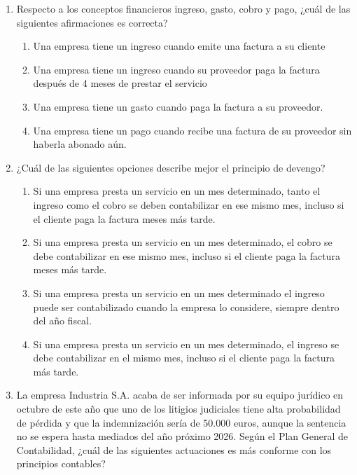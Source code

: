 \begin{enumerate}
\begin{enumerate}
        \item Si el EBITDA es negativo, quiere decir que la empresa no es rentable, puesto que el resultado bruto de explotación es negativo e incluso sin hacer frente a intereses e impuestos.
        \item Todas las anteriores
    \end{enumerate}
    \item Respecto a los conceptos financieros ingreso, gasto, cobro y pago, ¿cuál de las siguientes afirmaciones es correcta?
    \begin{enumerate}
        \item Una empresa tiene un ingreso cuando emite una factura a su cliente
        \item Una empresa tiene un ingreso cuando su proveedor paga la factura después de 4 meses de prestar el servicio
        \item Una empresa tiene un gasto cuando paga la factura a su proveedor.
        \item Una empresa tiene un pago cuando recibe una factura de su proveedor sin haberla abonado aún.
    \end{enumerate}
    \item ¿Cuál de las siguientes opciones describe mejor el principio de devengo?
    \begin{enumerate}
        \item Si una empresa presta un servicio en un mes determinado, tanto el ingreso como el cobro se deben contabilizar en ese mismo mes, incluso si el cliente paga la factura meses más tarde.
        \item Si una empresa presta un servicio en un mes determinado, el cobro se debe contabilizar en ese mismo mes, incluso si el cliente paga la factura meses más tarde.
        \item Si una empresa presta un servicio en un mes determinado el ingreso puede ser contabilizado cuando la empresa lo  considere, siempre dentro del año fiscal.
        \item Si una empresa presta un servicio en un mes determinado, el ingreso se debe contabilizar en el mismo mes, incluso si el cliente paga la factura más tarde.
    \end{enumerate}
    \item La empresa Industria S.A. acaba de ser informada por su equipo jurídico en octubre de este año que uno de los litigios judiciales tiene alta probabilidad de pérdida y que la indemnización sería de 50.000 euros, aunque la sentencia no se espera hasta mediados del año próximo 2026. Según el Plan General de Contabilidad, ¿cuál de las siguientes actuaciones es más conforme con los principios contables?

\end{enumerate}
